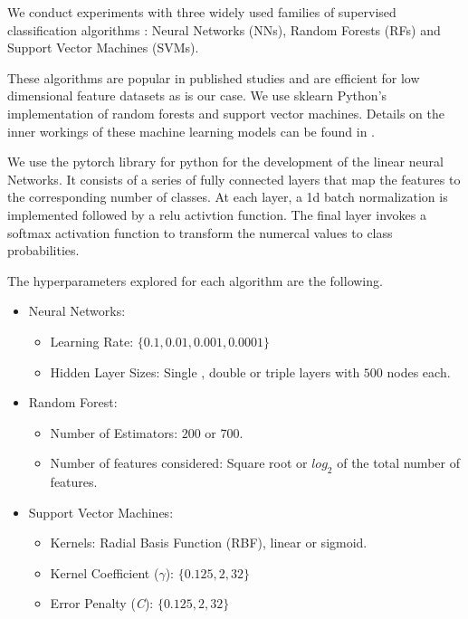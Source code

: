 \documentclass[usenatbib]{mnras}
\begin{document}
We conduct experiments with three widely used families of supervised classification 
algorithms \citep{skysurvey, 1601.03931}: Neural Networks (NNs), Random Forests (RFs) and Support
Vector Machines (SVMs). 

These algorithms are popular in published studies and are efficient 
for low dimensional feature datasets as is our case. 
We use sklearn \citep{1201.0490} Python's implementation of random forests and support vector machines. 
Details on the inner workings of these machine learning models can be found in \cite{9780387848570}.

We use the pytorch library for python for the development of the linear neural Networks. It consists of a series of fully connected layers that map the features to the corresponding number of classes. At each layer, a 1d batch normalization is implemented followed by a relu activtion function. The final layer invokes a softmax activation function to transform the numercal values to class probabilities.

The hyperparameters explored for each algorithm are the
following. 

\begin{itemize}
\item Neural Networks:
\begin{itemize}
\item Learning Rate: $\{0.1,0.01,0.001,0.0001\}$
\item Hidden Layer Sizes: Single , double or triple layers with $500$ nodes each.
\end{itemize}

\item Random Forest:
\begin{itemize}
    \item Number of Estimators: $200$ or $700$.
    \item Number of features considered: Square root or $log_2$ of the total number of features.
\end{itemize}

\item Support Vector Machines:
\begin{itemize}
    \item Kernels: Radial Basis Function (RBF), linear or sigmoid.
    \item Kernel Coefficient ($\gamma$):  
      $\{0.125, 2, 32\}$
    \item Error Penalty (\textit{C}): $\{0.125, 2, 32\}$
\end{itemize}
\end{itemize}
\end{document}
